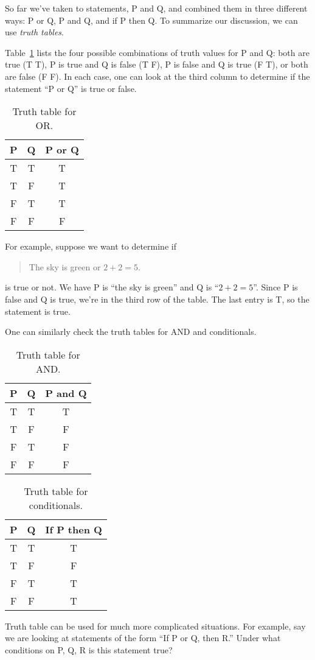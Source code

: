 \documentclass{tufte-book}
\begin{document}
So far we've taken to statements, P and Q, and combined them in three different ways: P or Q, P and Q, and if P then Q. To summarize our discussion, we can use \emph{truth tables}. 

Table~\ref{tab:truth-table-or} lists the four possible combinations of truth values for P and Q: both are true (T T), P is true and Q is false (T F), P is false and Q is true (F T), or both are false (F F). In each case, one can look at the third column to determine if the statement ``P or Q'' is true or false.
\begin{table}
  \centering
  \begin{tabular}{ccc}
    \toprule
    P & Q & P or Q \\ \midrule
    T & T & T \\
    T & F & T \\
    F & T & T \\
    F & F & F \\ \bottomrule
  \end{tabular}
  \caption{Truth table for OR.}
  \label{tab:truth-table-or}
\end{table}

For example, suppose we want to determine if 
\begin{quote}
  The sky is green or $2 + 2 = 5$.
\end{quote}
is true or not. We have P is ``the sky is green'' and Q is ``$2 + 2 = 5$''. Since P is false and Q is true, we're in the third row of the table. The last entry is T, so the statement is true.

One can similarly check the truth tables for AND and conditionals.

\begin{table}
  \centering
  \begin{tabular}{ccc}
    \toprule
    P & Q & P and Q \\ \midrule
    T & T & T \\
    T & F & F \\
    F & T & F \\
    F & F & F \\ \bottomrule
  \end{tabular}
  \caption{Truth table for AND.}
  \label{tab:truth-table-and}
\end{table}

\begin{table}
  \centering
  \begin{tabular}{ccc}
    \toprule
    P & Q & If P then Q \\ \midrule
    T & T & T \\
    T & F & F \\
    F & T & T \\
    F & F & T \\ \bottomrule
  \end{tabular}
  \caption{Truth table for conditionals.}
  \label{tab:truth-table-conditionals}
\end{table}
Truth table can be used for much more complicated situations. For example, say we are looking at statements of the form ``If P or Q, then R.'' Under what conditions on P, Q, R is this statement true?
\end{document}
